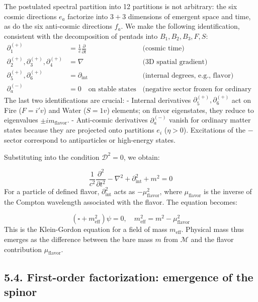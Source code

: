 \documentclass[11pt]{article}
\let\oldmathcal\mathcal
\renewcommand{\mathcal}[1]{\oldmathcal{#1}}
\let\Box\square
\providecommand{\Box}{\square}
\begin{document}
The postulated spectral partition into 12 partitions is not arbitrary:
the six cosmic directions \(e_a\) factorize into \(3+3\) dimensions of
emergent space and time, as do the six anti-cosmic directions \(f_a\).
We make the following identification, consistent with the decomposition
of pentads into \({B_1, B_2, B_3, F, S}\): \[
\begin{aligned}
\partial_1^{(+)} &= \frac{1}{c}\frac{\partial}{\partial t} \quad &\text{(cosmic time)} \\
\partial_2^{(+)}, \partial_3^{(+)}, \partial_4^{(+)} &= \nabla \quad &\text{(3D spatial gradient)} \\
\partial_5^{(+)}, \partial_6^{(+)} &= \partial_{\text{int}} \quad &\text{(internal degrees, e.g., flavor)} \\
\partial_a^{(-)} &= 0 \quad \text{on stable states} \quad &\text{(negative sector frozen for ordinary matter)}
\end{aligned}
\] The last two identifications are crucial: - Internal derivatives
\(\partial_5^{(+)}, \partial_6^{(+)}\) act on Fire (\(F=i'v\)) and Water
(\(S=1v\)) elements; on flavor eigenstates, they reduce to eigenvalues
\(\pm i m_{\text{flavor}}\). - Anti-cosmic derivatives
\(\partial_a^{(-)}\) vanish for ordinary matter states because they are
projected onto partitions \(e_i\) (\(\eta>0\)). Excitations of the \(-\)
sector correspond to antiparticles or high-energy states.

Substituting into the condition \(\mathcal{D}^2=0\), we obtain:

\[
\frac{1}{c^2}\frac{\partial^2}{\partial t^2} - \nabla^2 + \partial_{\text{int}}^2 + m^2 = 0
\] For a particle of defined flavor, \(\partial_{\text{int}}^2\) acts as
\(-\mu_{\text{flavor}}^2\), where \(\mu_{\text{flavor}}\) is the inverse
of the Compton wavelength associated with the flavor. The equation
becomes:

\[
\left( \Box + m_{\text{eff}}^2 \right) \psi = 0, \quad m_{\text{eff}}^2 = m^2 - \mu_{\text{flavor}}^2
\] This is the Klein-Gordon equation for a field of mass
\(m_{\text{eff}}\). Physical mass thus emerges as the difference between
the bare mass \(m\) from \(\mathcal{M}\) and the flavor contribution
\(\mu_{\text{flavor}}\).

\hypertarget{first-order-factorization-emergence-of-the-spinor}{%
\subsection{5.4. First-order factorization: emergence of the
spinor}\label{first-order-factorization-emergence-of-the-spinor}}
\end{document}

